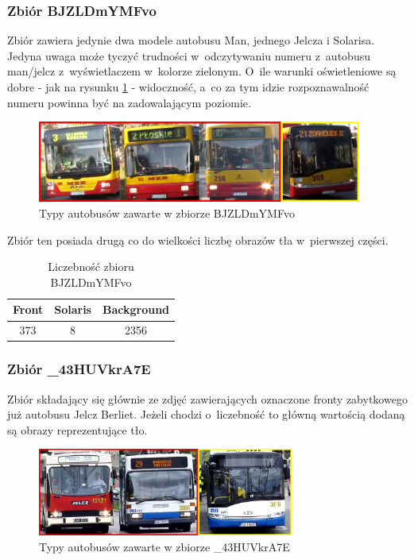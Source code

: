 \subsubsection{Zbiór BJZLDmYMFvo}

Zbiór zawiera jedynie dwa modele autobusu Man, jednego
Jelcza i Solarisa. Jedyna uwaga może tyczyć trudności w~odczytywaniu
numeru z~autobusu man/jelcz z~wyświetlaczem w~kolorze zielonym. O~ile
warunki oświetleniowe są dobre - jak na rysunku \ref{fig:BJZLDmYMFvo_types}
- widoczność, a~co za tym idzie rozpoznawalność numeru powinna być na 
zadowalającym poziomie.

\begin{figure}[!h]
    \centering
    \includegraphics[width=0.95\textwidth]{img/exp_trainig_data_BJZ}
    \caption{Typy autobusów zawarte w zbiorze BJZLDmYMFvo}
    \label{fig:BJZLDmYMFvo_types}
\end{figure}

Zbiór ten posiada drugą co do wielkości 
liczbę obrazów tła w~pierwszej części. 

\begin{table}[!h]
    \centering
    \begin{tabular}{c|c|c}
        Front   & Solaris   & Background \\ \hline
        373     & 8         & 2356
    \end{tabular}
    \caption{Liczebność zbioru BJZLDmYMFvo}
    \label{tab:BJZLDmYMFvo_count}
\end{table}

\subsubsection{Zbiór \_43HUVkrA7E}

Zbiór składający się głównie ze zdjęć zawierających oznaczone fronty
zabytkowego już autobusu Jelcz Berliet. Jeżeli chodzi o~liczebność to 
główną wartością dodaną są obrazy reprezentujące tło.

\begin{figure}[!h]
    \centering
    \includegraphics[width=0.75\textwidth]{img/exp_trainig_data__43}
    \caption{Typy autobusów zawarte w zbiorze \_43HUVkrA7E}
    \label{fig:_43HUVkrA7E_types}
\end{figure}

